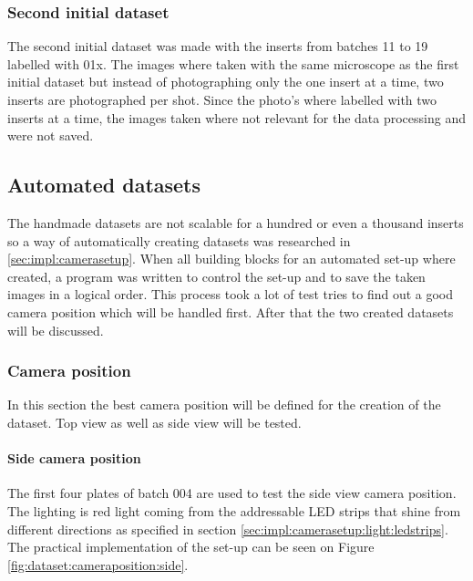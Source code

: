 	
		\subsubsection{Second initial dataset}

			The second initial dataset was made with the inserts from batches 11 to 19 labelled with 01x. The images where taken with the same microscope as the first initial dataset but instead of photographing only the one insert at a time, two inserts are photographed per shot.
Since the photo's where labelled with two inserts at a time, the images taken where not relevant for the data processing and were not saved.

	\subsection{Automated datasets}

	The handmade datasets are not scalable for a hundred or even a thousand inserts so a way of automatically creating datasets was researched in \ref{sec:impl:camerasetup}. When all building blocks for an automated set-up where created, a program was written to control the set-up and to save the taken images in a logical order. This process took a lot of test tries to find out a good camera position which will be handled first. After that the two created datasets will be discussed.

		\subsubsection{Camera position}
		In this section the best camera position will be defined  for the creation of the dataset. Top view as well as side view will be tested.

		\paragraph{Side camera position}

		The first four plates of batch 004 are used to test the side view camera position. The lighting is red light coming from the addressable LED strips that shine from different directions as specified in section \ref{sec:impl:camerasetup:light:ledstrips}. The practical implementation of the set-up can be seen on Figure \ref{fig:dataset:cameraposition:side}.

